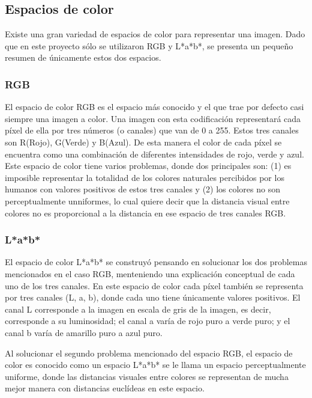 \documentclass[10pt,twocolumn,letterpaper]{article}
\begin{document}
\subsection{Espacios de color \cite{Forsyth}} 

Existe una gran variedad de espacios de color para representar una imagen. Dado que en este proyecto sólo se utilizaron RGB y L*a*b*, se presenta un pequeño resumen de únicamente estos dos espacios.

\subsubsection{RGB}
El espacio de color RGB es el espacio más conocido y el que trae por defecto casi siempre una imagen a color. Una imagen con esta codificación representará cada píxel de ella por tres números (o canales) que van de 0 a 255. Estos tres canales son R(Rojo), G(Verde) y B(Azul). De esta manera el color de cada píxel se encuentra como una combinación de diferentes intensidades de rojo, verde y azul. Este espacio de color tiene varios problemas, donde dos principales son: (1) es imposible representar la totalidad de los colores naturales percibidos por los humanos con valores positivos de estos tres canales y (2) los colores no son perceptualmente unniformes, lo cual quiere decir que la distancia visual entre colores no es proporcional a la distancia en ese espacio de tres canales RGB.

\subsubsection{L*a*b*}
El espacio de color L*a*b* se construyó pensando en solucionar los dos problemas mencionados en el caso RGB, menteniendo una explicación conceptual de cada uno de los tres canales. En este espacio de color cada píxel también se representa por tres canales (L, a, b), donde cada uno tiene únicamente valores positivos. El canal L corresponde a la imagen en escala de gris de la imagen, es decir, corresponde a su luminosidad; el canal a varía de rojo puro a verde puro; y el canal b varía de amarillo puro a azul puro. 

Al solucionar el segundo problema mencionado del espacio RGB, el espacio de color es conocido como un espacio L*a*b* se le llama un espacio perceptualmente uniforme, donde las distancias visuales entre colores se representan de mucha mejor manera con distancias euclídeas en este espacio. 
\end{document}
